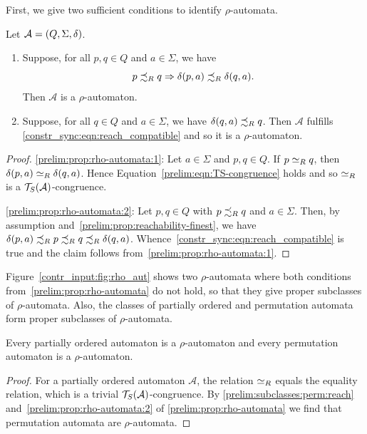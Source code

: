 First, we give two sufficient conditions to identify $\rho$-automata.

\begin{proposition}\label{prelim:prop:rho-automata}
	Let $\mathcal A = (Q, \Sigma, \delta)$.
	
	\begin{enumerate}
	\item \label{prelim:prop:rho-automata:1} Suppose,  for all $p,q \in Q$ and $a \in \Sigma$, we have
	\begin{equation}\label{constr_sync:eqn:reach_compatible}
		p \precsim_R q \Rightarrow \delta(p,a) \precsim_R \delta(q,a).
	\end{equation}
	Then $\mathcal A$ is a $\rho$-automaton.
	
	\item \label{prelim:prop:rho-automata:2} Suppose, for all $q\in Q$ and $a \in \Sigma$,
	 we have $\delta(q,a) \precsim_R q$.
	 Then $\mathcal A$ 
	 fulfills \cref{constr_sync:eqn:reach_compatible} and so it is a $\rho$-automaton.
	\end{enumerate}
\end{proposition}
\begin{proof}
\ref{prelim:prop:rho-automata:1}: Let $a \in \Sigma$ and $p,q \in Q$. If $p \simeq_R q$, 
then $\delta(p,a) \simeq_R \delta(q,a)$.	
Hence Equation~\eqref{prelim:eqn:TS-congruence} 
holds and so $\simeq_R$ is a $\mathcal T_S(\mathcal A)$-congruence.
	
\ref{prelim:prop:rho-automata:2}: Let $p,q \in Q$ with $p \precsim_R q$ and $a \in \Sigma$.
Then, by assumption and~\cref{prelim:prop:reachability-finest},
we have $\delta(p,a) \precsim_R p \precsim_R q \precsim_R \delta(q,a)$.
Whence~\cref{constr_sync:eqn:reach_compatible}
is true and the claim follows from~\cref{prelim:prop:rho-automata:1}.
\end{proof}

Figure~\ref{contr_input:fig:rho_aut} shows
two $\rho$-automata where both conditions
from~\cref{prelim:prop:rho-automata} do not hold,
so that they give proper subclasses of $\rho$-automata.
Also, the classes of partially ordered
and permutation automata form proper subclasses
of $\rho$-automata.

\begin{proposition}
	\label{constr_sync:prop:pto_comm_rho_automata}
	Every partially ordered automaton is a $\rho$-automaton
	and every permutation automaton is a $\rho$-automaton.
\end{proposition}
\begin{proof}
	For a partially ordered automaton $\mathcal A$, the relation
	$\simeq_R$ equals the equality relation, which is a trivial $\mathcal T_S(\mathcal A)$-congruence. 
    By \cref{prelim:subclasses:perm:reach}
	and~\cref{prelim:prop:rho-automata:2} of \cref{prelim:prop:rho-automata}
	we find that permutation automata are $\rho$-automata.
\end{proof}	

